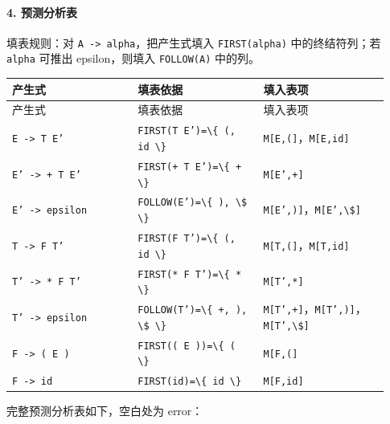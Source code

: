 \documentclass[UTF8]{ctexart}
\begin{document}
\paragraph*{4. 预测分析表}

填表规则：对 \texttt{A -> alpha}，把产生式填入 \texttt{FIRST(alpha)} 中的终结符列；若 \texttt{alpha} 可推出 epsilon，则填入 \texttt{FOLLOW(A)} 中的列。

\begin{longtable}{|p{0.31\linewidth}|p{0.31\linewidth}|p{0.31\linewidth}|}
\hline
产生式 & 填表依据 & 填入表项 \\
\hline
\endfirsthead
产生式 & 填表依据 & 填入表项 \\
\hline
\endhead
\texttt{E -> T E'} & \texttt{FIRST(T E')=\textbackslash{}\{ (, id \textbackslash{}\}} & \texttt{M[E,(]}，\texttt{M[E,id]} \\
\hline
\texttt{E' -> + T E'} & \texttt{FIRST(+ T E')=\textbackslash{}\{ + \textbackslash{}\}} & \texttt{M[E',+]} \\
\hline
\texttt{E' -> epsilon} & \texttt{FOLLOW(E')=\textbackslash{}\{ ), \textbackslash{}\$ \textbackslash{}\}} & \texttt{M[E',)]}，\texttt{M[E',\textbackslash{}\$]} \\
\hline
\texttt{T -> F T'} & \texttt{FIRST(F T')=\textbackslash{}\{ (, id \textbackslash{}\}} & \texttt{M[T,(]}，\texttt{M[T,id]} \\
\hline
\texttt{T' -> * F T'} & \texttt{FIRST(* F T')=\textbackslash{}\{ * \textbackslash{}\}} & \texttt{M[T',*]} \\
\hline
\texttt{T' -> epsilon} & \texttt{FOLLOW(T')=\textbackslash{}\{ +, ), \textbackslash{}\$ \textbackslash{}\}} & \texttt{M[T',+]}，\texttt{M[T',)]}，\texttt{M[T',\textbackslash{}\$]} \\
\hline
\texttt{F -> ( E )} & \texttt{FIRST(( E ))=\textbackslash{}\{ ( \textbackslash{}\}} & \texttt{M[F,(]} \\
\hline
\texttt{F -> id} & \texttt{FIRST(id)=\textbackslash{}\{ id \textbackslash{}\}} & \texttt{M[F,id]} \\
\hline
\end{longtable}

完整预测分析表如下，空白处为 error：
\end{document}
